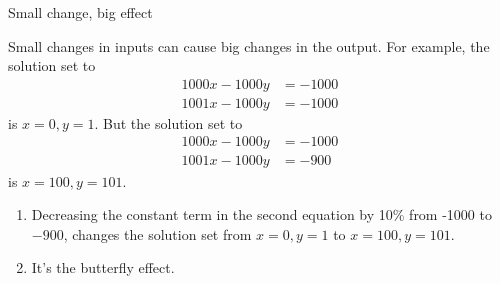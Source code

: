 \documentclass[usenames,dvipsnames,fleqn]{beamer}
\author[BW]{BW}
\theoremstyle{definition}
\begin{document}
\begin{frame}{Small change, big effect}


Small changes in inputs can cause big changes in the output. For example, the solution set to 
\begin{align*}
    1000 x - 1000 y &= -1000\\
   1001 x - 1000 y &= -1000
\end{align*}
is \(x = 0, y = 1 \).  But the solution set to
\begin{align*}
    1000 x - 1000 y &= -1000 \\
   1001 x - 1000 y &= -900
\end{align*}
is \(x=100,y=101\). 


\begin{enumerate}

\item  Decreasing the constant term in the second equation by 10\% from -1000 to  \(-900\), changes the solution set from \(x=0,y=1\) to 
 \(x=100,y=101\). 
 
 \item It's the butterfly effect.
\end{enumerate}

\end{frame}
\end{document}

